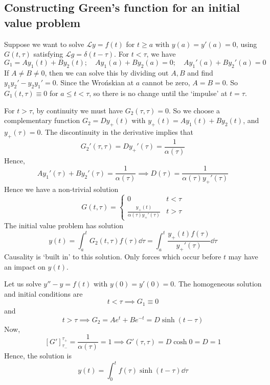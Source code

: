 \subsection{Constructing Green's function for an initial value problem}
Suppose we want to solve \( \mathcal L y = f(t) \) for \( t \geq a \) with \( y(a) = y'(a) = 0 \), using \( G(t, \tau) \) satisfying \( \mathcal L g = \delta(t - \tau) \).
For \( t < \tau \), we have
\[
	G_1 = A y_1(t) + B y_2(t);\quad A y_1(a) + B y_2(a) = 0;\quad A y_1'(a) + B y_2'(a) = 0
\]
If \( A \neq B \neq 0 \), then we can solve this by dividing out \( A, B \) and find \( y_1 y_2' - y_2 y_1' = 0 \).
Since the Wro\'nskian at \( a \) cannot be zero, \( A = B = 0 \).
So \( G_1(t,\tau) \equiv 0 \) for \( a \leq t < \tau \), so there is no change until the `impulse' at \( t = \tau \).

For \( t > \tau \), by continuity we must have \( G_2(\tau, \tau) = 0 \).
So we choose a complementary function \( G_2 = D y_+(t) \) with \( y_+(t) = A y_1(t) + B y_2(t) \), and \( y_+(\tau) = 0 \).
The discontinuity in the derivative implies that
\[
	G_2'(\tau, \tau) = Dy_+'(\tau) = \frac{1}{\alpha(\tau)}
\]
Hence,
\[
	A y_1'(\tau) + B y_2'(\tau) = \frac{1}{\alpha(\tau)} \implies D(\tau) = \frac{1}{\alpha(\tau) y_+'(\tau)}
\]
Hence we have a non-trivial solution
\[
	G(t, \tau) = \begin{cases}
		0                                      & t < \tau \\
		\frac{y_+(t)}{\alpha(\tau) y_+'(\tau)} & t > \tau
	\end{cases}
\]
The initial value problem has solution
\[
	y(t) = \int_a^t G_2(t, \tau) f(\tau) \dd{\tau} = \int_a^t \frac{y_+(t) f(\tau)}{y_+'(\tau)} \dd{\tau}
\]
Causality is `built in' to this solution.
Only forces which occur before \( t \) may have an impact on \( y(t) \).
\begin{example}
	Let us solve \( y''-y = f(t) \) with \( y(0) = y'(0) = 0 \).
	The homogeneous solution and initial conditions are
	\[
		t < \tau \implies G_1 \equiv 0
	\]
	and
	\[
		t > \tau \implies G_2 = A e^t + Be^{-t} = D \sinh (t - \tau)
	\]
	Now,
	\[
		[G']_{\tau_-}^{\tau_+} = \frac{1}{\alpha(\tau)} = 1 \implies G'(\tau, \tau) = D \cosh 0 = D = 1
	\]
	Hence, the solution is
	\[
		y(t) = \int_0^t f(\tau) \sinh (t - \tau) \dd{\tau}
	\]
\end{example}
